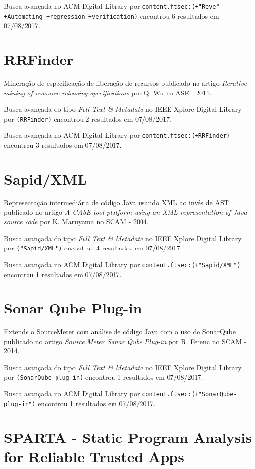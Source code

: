 Busca avançada no ACM Digital Library por
\texttt{content.ftsec:(+"Reve" +Automating +regression +verification)}
encontrou
6 resultados em
07/08/2017.

\section{RRFinder}

Mineração de especificação de liberação de recursos
publicado no artigo
{\it Iterative mining of resource-releasing specifications}
por
Q. Wu
no
ASE
-
2011.

Busca avançada do tipo {\it Full Text \& Metadata} no IEEE Xplore Digital Library por
\texttt{(RRFinder)}
encontrou
2 resultados em
07/08/2017.

Busca avançada no ACM Digital Library por
\texttt{content.ftsec:(+RRFinder)}
encontrou
3 resultados em
07/08/2017.

\section{Sapid/XML}

Representação intermediária de código Java usando XML ao invés de AST
publicado no artigo
{\it A CASE tool platform using an XML representation of Java source code}
por
K. Maruyama
no
SCAM
-
2004.

Busca avançada do tipo {\it Full Text \& Metadata} no IEEE Xplore Digital Library por
\texttt{("Sapid/XML")}
encontrou
4 resultados em
07/08/2017.

Busca avançada no ACM Digital Library por
\texttt{content.ftsec:(+"Sapid/XML")}
encontrou
1 resultados em
07/08/2017.

\section{Sonar Qube Plug-in}

Extende o SourceMeter com análise de código Java com o uso do SonarQube
publicado no artigo
{\it Source Meter Sonar Qube Plug-in}
por
R. Ferenc
no
SCAM
-
2014.

Busca avançada do tipo {\it Full Text \& Metadata} no IEEE Xplore Digital Library por
\texttt{(SonarQube-plug-in)}
encontrou
1 resultados em
07/08/2017.

Busca avançada no ACM Digital Library por
\texttt{content.ftsec:(+"SonarQube-plug-in")}
encontrou
1 resultados em
07/08/2017.

\section{SPARTA - Static Program Analysis for Reliable Trusted Apps}

